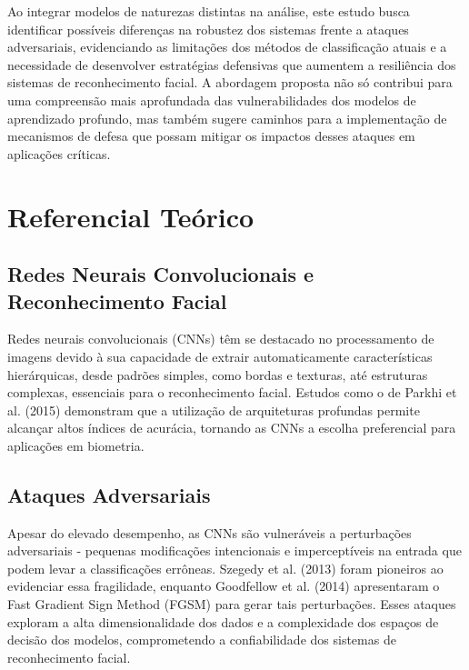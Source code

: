 \documentclass[12pt]{article}
\begin{document}
Ao integrar modelos de naturezas distintas na análise, este estudo busca
identificar possíveis diferenças na robustez dos sistemas frente a ataques
adversariais, evidenciando as limitações dos métodos de classificação atuais e
a necessidade de desenvolver estratégias defensivas que aumentem a resiliência
dos sistemas de reconhecimento facial. A abordagem proposta não só contribui
para uma compreensão mais aprofundada das vulnerabilidades dos modelos de
aprendizado profundo, mas também sugere caminhos para a implementação de
mecanismos de defesa que possam mitigar os impactos desses ataques em
aplicações críticas.

\section{Referencial Teórico}
\subsection{Redes Neurais Convolucionais e Reconhecimento Facial}
Redes neurais convolucionais (CNNs) têm se destacado no processamento de
imagens devido à sua capacidade de extrair automaticamente características
hierárquicas, desde padrões simples, como bordas e texturas, até estruturas
complexas, essenciais para o reconhecimento facial. Estudos como o de Parkhi et
al. (2015) demonstram que a utilização de arquiteturas profundas permite
alcançar altos índices de acurácia, tornando as CNNs a escolha preferencial
para aplicações em biometria.

\subsection{Ataques Adversariais}
Apesar do elevado desempenho, as CNNs são vulneráveis a perturbações
adversariais - pequenas modificações intencionais e imperceptíveis na entrada
que podem levar a classificações errôneas. Szegedy et al. (2013) foram
pioneiros ao evidenciar essa fragilidade, enquanto Goodfellow et al. (2014)
apresentaram o Fast Gradient Sign Method (FGSM) para gerar tais perturbações.
Esses ataques exploram a alta dimensionalidade dos dados e a complexidade dos
espaços de decisão dos modelos, comprometendo a confiabilidade dos sistemas de
reconhecimento facial.
\end{document}
